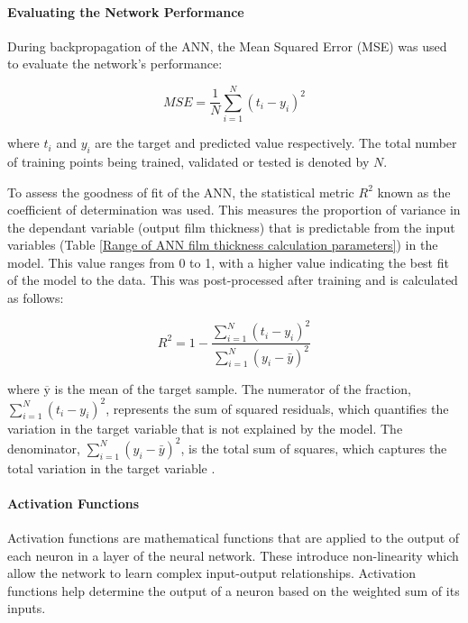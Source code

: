 \paragraph{Evaluating the Network Performance}

During backpropagation of the ANN, the Mean Squared Error (MSE) was used to evaluate the network's performance:

\begin{equation}\label{MSE}
	M S E=\frac{1}{N} \sum_{i=1}^N\left(t_i-y_i\right)^2
\end{equation}

where $t_i$ and $y_i$ are the target and predicted value respectively. The total number of training points being trained, validated or tested is denoted by $N$. 

To assess the goodness of fit of the ANN, the statistical metric $R^2$ known as the coefficient of determination was used. This measures the proportion of variance in the dependant variable (output film thickness) that is predictable from the input variables (Table \ref{Range of ANN film thickness calculation parameters}) in the model. This value ranges from 0 to 1, with a higher value indicating the best fit of the model to the data. This was post-processed after training and is calculated as follows:

\begin{equation}\label{R-squared}
	R^2=1-\frac{\sum_{i=1}^N\left(t_i-y_i\right)^2}{\sum_{i=1}^N\left(y_i-\bar{y}\right)^2}
\end{equation}

 where $\overline{\mathrm{y}}$ is the mean of the target sample. The numerator of the fraction, \( \sum_{i=1}^N(t_i - y_i)^2 \), represents the sum of squared residuals, which quantifies the variation in the target variable that is not explained by the model. The denominator, \( \sum_{i=1}^N(y_i - \bar{y})^2 \), is the total sum of squares, which captures the total variation in the target variable \cite{Marian2022}.

\paragraph{Activation Functions}

Activation functions are mathematical functions that are applied to the output of each neuron in a layer of the neural network. These introduce non-linearity which allow the network to learn complex input-output relationships. Activation functions help determine the  output of a neuron based on the weighted sum of its inputs.

